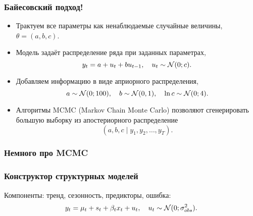 \begin{frame}
  \frametitle{Байесовский подход!}

  \begin{itemize}[<+->]
    \item Трактуем все параметры как ненаблюдаемые \alert{случайные величины}, $\theta = (a, b, c)$.
    \item \alert{Модель} задаёт распределение ряда при заданных параметрах,
    \[
    y_t = a + u_t + b u_{t-1}, \quad u_t \sim \mathcal{N}(0; c).  
    \]
    \item Добавляем информацию в виде \alert{априорного распределения},
    \[
    a \sim \mathcal{N}(0;100), \quad b \sim \mathcal{N}(0, 1), \quad \ln c \sim \mathcal{N}(0;4).  
    \]
    \item Алгоритмы MCMC (Markov Chain Monte Carlo) позволяют 
    сгенерировать большую выборку из \alert{апостериорного распределение}
    \[
    (a, b, c \mid y_1, y_2, \ldots, y_T).
    \]
\end{itemize}

\end{frame}


\begin{frame}
  \frametitle{Немного про MCMC}
  
\begin{itemize}
  
\end{itemize}

\end{frame}

\begin{frame}
  \frametitle{Конструктор структурных моделей}

  Компоненты: \alert{тренд}, \alert{сезонность}, \alert{предикторы}, \alert{ошибка}:
  \[
  y_t = \mu_t + s_t + \beta_t x_t +  u_t, \quad u_t \sim \mathcal{N}(0; \sigma^2_{obs}).  
  \]


\end{frame}



